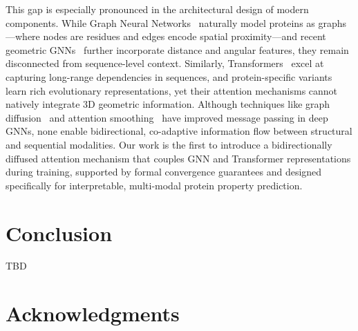 \documentclass[11pt]{article}
\begin{document}
This gap is especially pronounced in the architectural design of modern
components. While Graph Neural
Networks~\cite{kipf2017semi,velivckovic2018graph} naturally model proteins as
graphs—where nodes are residues and edges encode spatial proximity—and recent
geometric GNNs~\cite{jing2021learning} further incorporate distance and angular
features, they remain disconnected from sequence-level context. Similarly,
Transformers~\cite{vaswani2017attention} excel at capturing long-range
dependencies in sequences, and protein-specific
variants~\cite{rives2021biological,rao2021transformer} learn rich evolutionary
representations, yet their attention mechanisms cannot natively integrate 3D
geometric information. Although techniques like graph
diffusion~\cite{klicpera2019diffusion} and attention
smoothing~\cite{li2020deepergcn} have improved message passing in deep GNNs,
none enable bidirectional, co-adaptive information flow between structural and
sequential modalities. Our work is the first to introduce a bidirectionally
diffused attention mechanism that couples GNN and Transformer representations
during training, supported by formal convergence guarantees and designed
specifically for interpretable, multi-modal protein property prediction.




\section{Conclusion}


TBD


\section*{Acknowledgments}




\appendix

\end{document}

